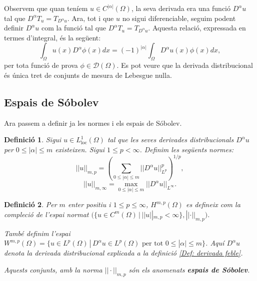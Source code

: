 \documentclass{article}
\numberwithin{equation}{section}
\newtheorem{definicio}{Definici\'{o}}[section]
\begin{document}
Observem que quan ten\'{i}em $u\in C^{|\alpha|}(\Omega)$, la seva derivada era una funci\'{o} $D^{\alpha}u$ tal que $D^{\alpha}T_u=T_{D^{\alpha}u}$. Ara, tot i que $u$ no sigui diferenciable, seguim podent definir $D^{\alpha}u$ com la funci\'{o} tal que $D^{\alpha}T_u=T_{D^{\alpha}u}$. Aquesta relaci\'{o}, expressada en termes d'integral, \'{e}s la seg\"{u}ent:
\begin{equation}
\int_{\Omega}u(x)D^{\alpha}\phi(x)dx=(-1)^{|\alpha|}\int_{\Omega}D^{\alpha}u(x)\phi(x)dx,
\end{equation}
per tota funci\'{o} de prova $\phi\in\mathcal{D}(\Omega)$. Es pot veure que la derivada distribucional \'{e}s \'{u}nica tret de conjunts de mesura de Lebesgue nul\textperiodcentered la.

\subsection{Espais de S\'{o}bolev}

Ara passem a definir ja les normes i els espais de S\'{o}bolev.

\begin{definicio}
Sigui $u\in L_{\text{loc}}^1(\Omega)$ tal que les seves derivades distribucionals $D^{\alpha}u$ per $0\leq|\alpha|\leq m$ existeixen. Sigui $1\leq p<\infty$. Definim les seg\"{u}ents normes:
\begin{equation}||u||_{m,p}=\left(\sum_{0\leq|\alpha|\leq m}||D^{\alpha}u||_{L^p}^p\right)^{1/p},
\end{equation}
\begin{equation}
||u||_{m,\infty}=\max_{0\leq|\alpha|\leq m}||D^{\alpha}u||_{L^{\infty}}.
\end{equation}
\end{definicio}

\begin{definicio}
Per $m$ enter positiu i $1\leq p\leq\infty$, $H^{m,p}(\Omega)$ es defineix com la compleci\'{o} de l'espai normat $\big(\{u\in C^m(\Omega)\,|\,||u||_{m,p}<\infty\},||\cdot||_{m,p}\big)$.

Tamb\'{e} definim l'espai $W^{m,p}(\Omega)=\{u\in L^p(\Omega)\,|\,D^{\alpha}u\in L^p(\Omega)\text{ per tot }0\leq|\alpha|\leq m\}$. Aqu\'{i} $D^{\alpha}u$ denota la derivada distribucional explicada a la definici\'{o} \ref{Def: derivada feble}.

Aquests conjunts, amb la norma $||\cdot||_{m,p}$ s\'{o}n els anomenats \textbf{espais de S\'{o}bolev}.
\end{definicio}
\end{document}
